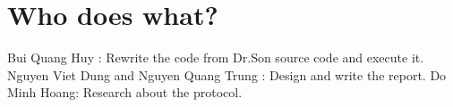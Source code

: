 \documentclass{article}
\begin{document}
\section{Who does what?}
    Bui Quang Huy : Rewrite the code from Dr.Son source code and execute it.
    \newline
    Nguyen Viet Dung and Nguyen Quang Trung : Design and write the report.
    \newline
    Do Minh Hoang: Research about the protocol.
\end{document}
